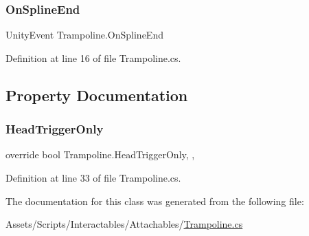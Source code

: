 \subsubsection{\texorpdfstring{On\+Spline\+End}{OnSplineEnd}}
{\footnotesize\ttfamily Unity\+Event Trampoline.\+On\+Spline\+End}



Definition at line 16 of file Trampoline.\+cs.



\subsection{Property Documentation}
\mbox{\label{class_trampoline_a7888515923868cf96a0f0bb60b318b63}} 
\subsubsection{\texorpdfstring{Head\+Trigger\+Only}{HeadTriggerOnly}}
{\footnotesize\ttfamily override bool Trampoline.\+Head\+Trigger\+Only\hspace{0.3cm}{\ttfamily [get]}, {\ttfamily [set]}, {\ttfamily [protected]}}



Definition at line 33 of file Trampoline.\+cs.



The documentation for this class was generated from the following file\+:\begin{DoxyCompactItemize}
\item 
Assets/\+Scripts/\+Interactables/\+Attachables/\mbox{\hyperlink{_trampoline_8cs}{Trampoline.\+cs}}\end{DoxyCompactItemize}
